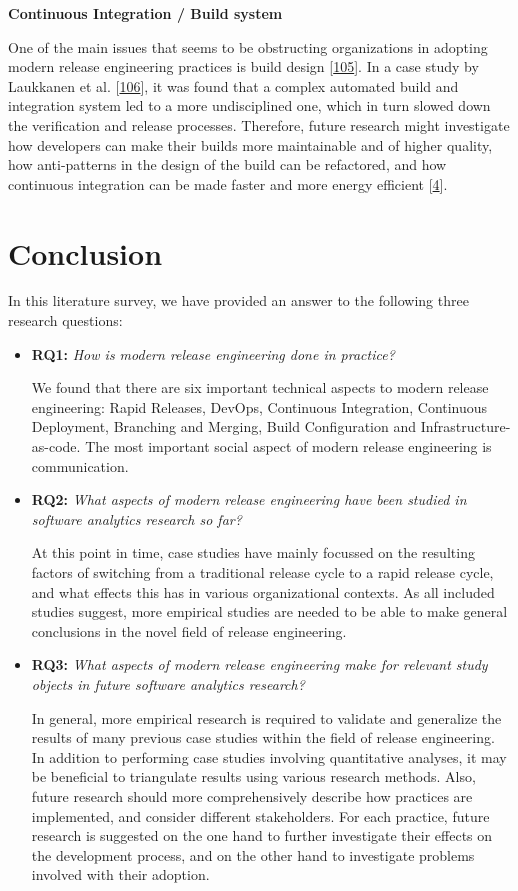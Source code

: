 \documentclass[]{book}
\begin{document}
\textbf{Continuous Integration / Build system}

One of the main issues that seems to be obstructing organizations in
adopting modern release engineering practices is build design
{[}\protect\hyperlink{ref-laukkanen2017a}{105}{]}. In a case study by
Laukkanen et al. {[}\protect\hyperlink{ref-laukkanen2018a}{106}{]}, it
was found that a complex automated build and integration system led to a
more undisciplined one, which in turn slowed down the verification and
release processes. Therefore, future research might investigate how
developers can make their builds more maintainable and of higher
quality, how anti-patterns in the design of the build can be refactored,
and how continuous integration can be made faster and more energy
efficient {[}\protect\hyperlink{ref-adams2016a}{4}{]}.

\section{Conclusion}\label{conclusion-1}

In this literature survey, we have provided an answer to the following
three research questions:

\begin{itemize}
\item
  \textbf{RQ1:} \emph{How is modern release engineering done in
  practice?}

  We found that there are six important technical aspects to modern
  release engineering: Rapid Releases, DevOps, Continuous Integration,
  Continuous Deployment, Branching and Merging, Build Configuration and
  Infrastructure-as-code. The most important social aspect of modern
  release engineering is communication.
\item
  \textbf{RQ2:} \emph{What aspects of modern release engineering have
  been studied in software analytics research so far?}

  At this point in time, case studies have mainly focussed on the
  resulting factors of switching from a traditional release cycle to a
  rapid release cycle, and what effects this has in various
  organizational contexts. As all included studies suggest, more
  empirical studies are needed to be able to make general conclusions in
  the novel field of release engineering.
\item
  \textbf{RQ3:} \emph{What aspects of modern release engineering make
  for relevant study objects in future software analytics research?}

  In general, more empirical research is required to validate and
  generalize the results of many previous case studies within the field
  of release engineering. In addition to performing case studies
  involving quantitative analyses, it may be beneficial to triangulate
  results using various research methods. Also, future research should
  more comprehensively describe how practices are implemented, and
  consider different stakeholders. For each practice, future research is
  suggested on the one hand to further investigate their effects on the
  development process, and on the other hand to investigate problems
  involved with their adoption.
\end{itemize}
\end{document}
